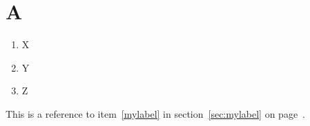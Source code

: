 \documentclass{article}
\makeatletter
\newcommand{\seclabel}[1]{{%
  \label{#1}%
  \edef\@currentlabel{\thesection}%
  \label{sec:#1}}}
\makeatother
\begin{document}
\section{A}

\begin{enumerate}
\item X
\item\seclabel{mylabel} Y
\item Z
\end{enumerate}

This is a reference to item~\ref{mylabel} in section~\ref{sec:mylabel}
on page~\pageref{mylabel}.
\end{document}
